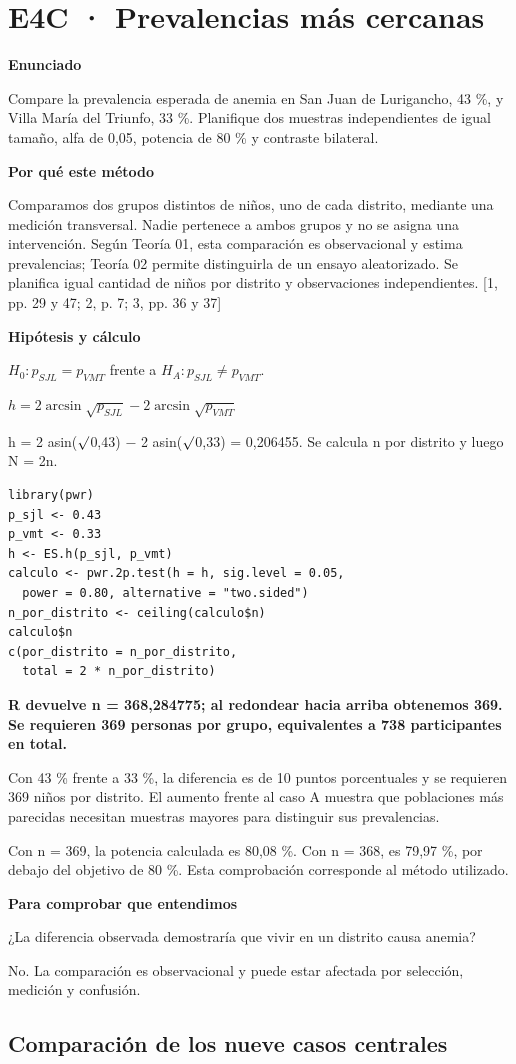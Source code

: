 \documentclass[10pt,a4paper]{article}
\newcommand{\etiqueta}[1]{\par{\bfseries\color{Blue}#1}\par}
\newcommand{\cajares}[1]{\par\colorbox{Pale}{\parbox{\dimexpr\linewidth-2\fboxsep}{\vspace{4pt}\textbf{\color{Navy}#1}\vspace{4pt}}}\par}
\begin{document}
\section*{E4C · Prevalencias más cercanas}
\etiqueta{Enunciado}
Compare la prevalencia esperada de anemia en San Juan de Lurigancho, 43 \%, y Villa María del Triunfo, 33 \%. Planifique dos muestras independientes de igual tamaño, alfa de 0,05, potencia de 80 \% y contraste bilateral.
\etiqueta{Por qué este método}
Comparamos dos grupos distintos de niños, uno de cada distrito, mediante una medición transversal. Nadie pertenece a ambos grupos y no se asigna una intervención. Según Teoría 01, esta comparación es observacional y estima prevalencias; Teoría 02 permite distinguirla de un ensayo aleatorizado. Se planifica igual cantidad de niños por distrito y observaciones independientes. [1, pp. 29 y 47; 2, p. 7; 3, pp. 36 y 37]
\etiqueta{Hipótesis y cálculo}
$H_0:p_{SJL}=p_{VMT}$ frente a $H_A:p_{SJL}\ne p_{VMT}$.

$h=2\arcsin\sqrt{p_{SJL}}-2\arcsin\sqrt{p_{VMT}}$

h = 2 asin(\ensuremath{\surd}0,43) \ensuremath{-} 2 asin(\ensuremath{\surd}0,33) = 0,206455. Se calcula n por distrito y luego N = 2n.
\begin{Verbatim}
library(pwr)
p_sjl <- 0.43
p_vmt <- 0.33
h <- ES.h(p_sjl, p_vmt)
calculo <- pwr.2p.test(h = h, sig.level = 0.05,
  power = 0.80, alternative = "two.sided")
n_por_distrito <- ceiling(calculo$n)
calculo$n
c(por_distrito = n_por_distrito,
  total = 2 * n_por_distrito)
\end{Verbatim}
\cajares{R devuelve n = 368,284775; al redondear hacia arriba obtenemos 369. Se requieren 369 personas por grupo, equivalentes a 738 participantes en total.}
Con 43 \% frente a 33 \%, la diferencia es de 10 puntos porcentuales y se requieren 369 niños por distrito. El aumento frente al caso A muestra que poblaciones más parecidas necesitan muestras mayores para distinguir sus prevalencias.

{\small\color{Gray}Con n = 369, la potencia calculada es 80,08 \%. Con n = 368, es 79,97 \%, por debajo del objetivo de 80 \%. Esta comprobación corresponde al método utilizado.}
\etiqueta{Para comprobar que entendimos}
¿La diferencia observada demostraría que vivir en un distrito causa anemia?

{\small No. La comparación es observacional y puede estar afectada por selección, medición y confusión.}
\clearpage

\subsection*{Comparación de los nueve casos centrales}
\end{document}
